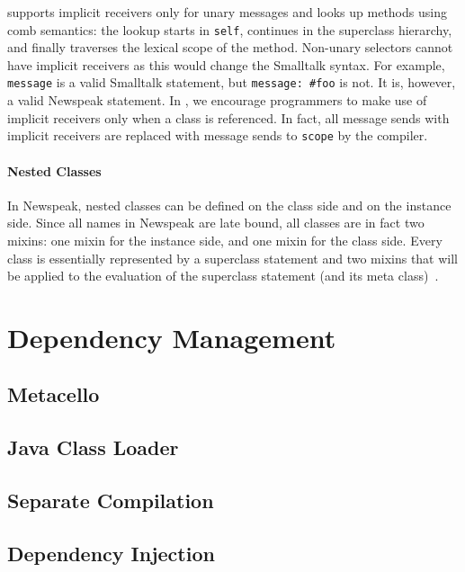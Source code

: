 \msname supports implicit receivers only for unary messages and looks up methods using comb semantics: the lookup starts in \texttt{self}, continues in the superclass hierarchy, and finally traverses the lexical scope of the method. Non-unary selectors cannot have implicit receivers as this would change the Smalltalk syntax. For example, \texttt{message} is a valid Smalltalk statement, but \texttt{message: \#foo} is not. It is, however, a valid Newspeak statement. In \msname, we encourage programmers to make use of implicit receivers only when a class is referenced. In fact, all message sends with implicit receivers are replaced with message sends to \texttt{scope} by the compiler.

\paragraph{Nested Classes}
In Newspeak, nested classes can be defined on the class side and on the instance side. Since all names in Newspeak are late bound, all classes are in fact two mixins: one mixin for the instance side, and one mixin for the class side. Every class is essentially represented by a superclass statement and two mixins that will be applied to the evaluation of the superclass statement (and its meta class)~\cite{Bracha09newspeakprogramming}.


\section{Dependency Management}

\subsection{Metacello}
\label{sec:rel_metacello}

\subsection{Java Class Loader}

\subsection{Separate Compilation}

\subsection{Dependency Injection}

